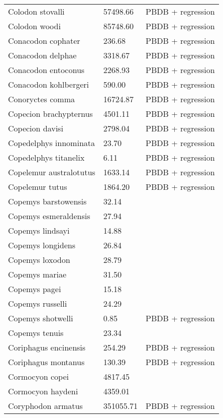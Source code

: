 \documentclass{article}
\begin{document}
\begin{center}
\begin{longtable}{p{} p{} p{}}
    Colodon stovalli & 57498.66 & PBDB + regression \\ 
    Colodon woodi & 85748.60 & PBDB + regression \\ 
    Conacodon cophater & 236.68 & PBDB + regression \\ 
    Conacodon delphae & 3318.67 & PBDB + regression \\ 
    Conacodon entoconus & 2268.93 & PBDB + regression \\ 
    Conacodon kohlbergeri & 590.00 & PBDB + regression \\ 
    Conoryctes comma & 16724.87 & PBDB + regression \\ 
    Copecion brachypternus & 4501.11 & PBDB + regression \\ 
    Copecion davisi & 2798.04 & PBDB + regression \\ 
    Copedelphys innominata & 23.70 & PBDB + regression \\ 
    Copedelphys titanelix & 6.11 & PBDB + regression \\ 
    Copelemur australotutus & 1633.14 & PBDB + regression \\ 
    Copelemur tutus & 1864.20 & PBDB + regression \\ 
    Copemys barstowensis & 32.14 & \cite{Tomiya2013} \\ 
    Copemys esmeraldensis & 27.94 & \cite{Tomiya2013} \\ 
    Copemys lindsayi & 14.88 & \cite{Tomiya2013} \\ 
    Copemys longidens & 26.84 & \cite{Tomiya2013} \\ 
    Copemys loxodon & 28.79 & \cite{Tomiya2013} \\ 
    Copemys mariae & 31.50 & \cite{Tomiya2013} \\ 
    Copemys pagei & 15.18 & \cite{Tomiya2013} \\ 
    Copemys russelli & 24.29 & \cite{Tomiya2013} \\ 
    Copemys shotwelli & 0.85 & PBDB + regression \\ 
    Copemys tenuis & 23.34 & \cite{Tomiya2013} \\ 
    Coriphagus encinensis & 254.29 & PBDB + regression \\ 
    Coriphagus montanus & 130.39 & PBDB + regression \\ 
    Cormocyon copei & 4817.45 & \cite{Tomiya2013} \\ 
    Cormocyon haydeni & 4359.01 & \cite{Tomiya2013} \\ 
    Coryphodon armatus & 351055.71 & PBDB + regression \\ 

\end{longtable}
\end{center}
\end{document}
